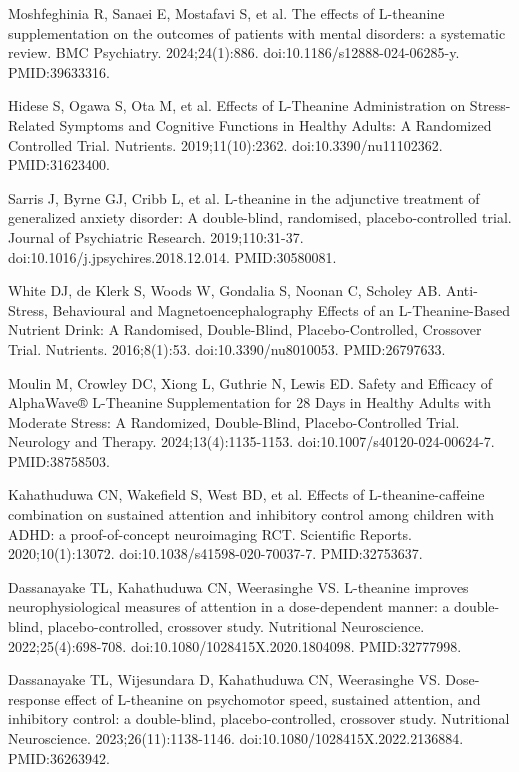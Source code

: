\documentclass[12pt,oneside]{book}
\newcommand{\reff}[2]{\par\hangindent=7mm\hangafter=1\noindent[#1]\hspace{2mm}#2\par}
\begin{document}
\reff{37}{Moshfeghinia R, Sanaei E, Mostafavi S, et al. The effects of L-theanine supplementation on the outcomes of patients with mental disorders: a systematic review. BMC Psychiatry. 2024;24(1):886. doi:10.1186/s12888-024-06285-y. PMID:39633316.}

\reff{38}{Hidese S, Ogawa S, Ota M, et al. Effects of L-Theanine Administration on Stress-Related Symptoms and Cognitive Functions in Healthy Adults: A Randomized Controlled Trial. Nutrients. 2019;11(10):2362. doi:10.3390/nu11102362. PMID:31623400.}

\reff{39}{Sarris J, Byrne GJ, Cribb L, et al. L-theanine in the adjunctive treatment of generalized anxiety disorder: A double-blind, randomised, placebo-controlled trial. Journal of Psychiatric Research. 2019;110:31-37. doi:10.1016/j.jpsychires.2018.12.014. PMID:30580081.}

\reff{40}{White DJ, de Klerk S, Woods W, Gondalia S, Noonan C, Scholey AB. Anti-Stress, Behavioural and Magnetoencephalography Effects of an L-Theanine-Based Nutrient Drink: A Randomised, Double-Blind, Placebo-Controlled, Crossover Trial. Nutrients. 2016;8(1):53. doi:10.3390/nu8010053. PMID:26797633.}

\reff{41}{Moulin M, Crowley DC, Xiong L, Guthrie N, Lewis ED. Safety and Efficacy of AlphaWave® L-Theanine Supplementation for 28 Days in Healthy Adults with Moderate Stress: A Randomized, Double-Blind, Placebo-Controlled Trial. Neurology and Therapy. 2024;13(4):1135-1153. doi:10.1007/s40120-024-00624-7. PMID:38758503.}

\reff{42}{Kahathuduwa CN, Wakefield S, West BD, et al. Effects of L-theanine-caffeine combination on sustained attention and inhibitory control among children with ADHD: a proof-of-concept neuroimaging RCT. Scientific Reports. 2020;10(1):13072. doi:10.1038/s41598-020-70037-7. PMID:32753637.}

\reff{43}{Dassanayake TL, Kahathuduwa CN, Weerasinghe VS. L-theanine improves neurophysiological measures of attention in a dose-dependent manner: a double-blind, placebo-controlled, crossover study. Nutritional Neuroscience. 2022;25(4):698-708. doi:10.1080/1028415X.2020.1804098. PMID:32777998.}

\reff{44}{Dassanayake TL, Wijesundara D, Kahathuduwa CN, Weerasinghe VS. Dose-response effect of L-theanine on psychomotor speed, sustained attention, and inhibitory control: a double-blind, placebo-controlled, crossover study. Nutritional Neuroscience. 2023;26(11):1138-1146. doi:10.1080/1028415X.2022.2136884. PMID:36263942.}
\end{document}
